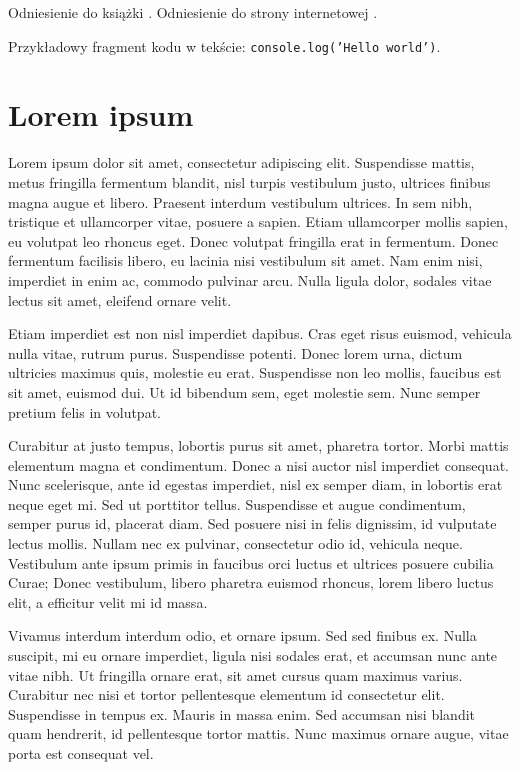 \documentclass[a4paper,12pt,polish,twoside]{extreport}
\begin{document}
Odniesienie do książki \cite{example_book}. Odniesienie do strony internetowej \cite{example_website}.

Przykładowy fragment kodu w tekście: \texttt{console.log('Hello world')}.

\section{Lorem ipsum}
Lorem ipsum dolor sit amet, consectetur adipiscing elit. Suspendisse mattis, metus fringilla fermentum blandit, nisl turpis vestibulum justo, ultrices finibus magna augue et libero. Praesent interdum vestibulum ultrices. In sem nibh, tristique et ullamcorper vitae, posuere a sapien. Etiam ullamcorper mollis sapien, eu volutpat leo rhoncus eget. Donec volutpat fringilla erat in fermentum. Donec fermentum facilisis libero, eu lacinia nisi vestibulum sit amet. Nam enim nisi, imperdiet in enim ac, commodo pulvinar arcu. Nulla ligula dolor, sodales vitae lectus sit amet, eleifend ornare velit.

Etiam imperdiet est non nisl imperdiet dapibus. Cras eget risus euismod, vehicula nulla vitae, rutrum purus. Suspendisse potenti. Donec lorem urna, dictum ultricies maximus quis, molestie eu erat. Suspendisse non leo mollis, faucibus est sit amet, euismod dui. Ut id bibendum sem, eget molestie sem. Nunc semper pretium felis in volutpat.

Curabitur at justo tempus, lobortis purus sit amet, pharetra tortor. Morbi mattis elementum magna et condimentum. Donec a nisi auctor nisl imperdiet consequat. Nunc scelerisque, ante id egestas imperdiet, nisl ex semper diam, in lobortis erat neque eget mi. Sed ut porttitor tellus. Suspendisse et augue condimentum, semper purus id, placerat diam. Sed posuere nisi in felis dignissim, id vulputate lectus mollis. Nullam nec ex pulvinar, consectetur odio id, vehicula neque. Vestibulum ante ipsum primis in faucibus orci luctus et ultrices posuere cubilia Curae; Donec vestibulum, libero pharetra euismod rhoncus, lorem libero luctus elit, a efficitur velit mi id massa.

Vivamus interdum interdum odio, et ornare ipsum. Sed sed finibus ex. Nulla suscipit, mi eu ornare imperdiet, ligula nisi sodales erat, et accumsan nunc ante vitae nibh. Ut fringilla ornare erat, sit amet cursus quam maximus varius. Curabitur nec nisi et tortor pellentesque elementum id consectetur elit. Suspendisse in tempus ex. Mauris in massa enim. Sed accumsan nisi blandit quam hendrerit, id pellentesque tortor mattis. Nunc maximus ornare augue, vitae porta est consequat vel.
\end{document}

